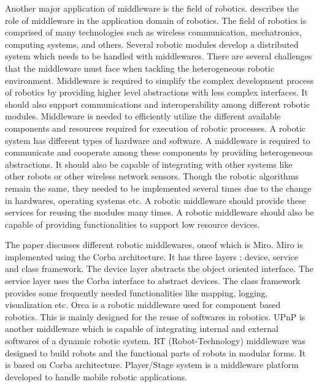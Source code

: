 \documentclass{acm_proc_article-sp}
\begin{document}

Another major application of middleware is the field of robotics. \cite{Mohamed:2011p8374} describes the role of middleware in the application domain of robotics. The field of robotics is comprised of many technologies such as wireless communication, mechatronics, computing systems, and others. Several robotic modules develop a distributed system which needs to be handled with middlewares. There are several challenges that the middleware must face when tackling the heterogeneous robotic environment. Middleware is required to simplify the complex development process of robotics by providing higher level abstractions with less complex interfaces. It should also support communications and interoperability among different robotic modules. Middleware is needed to efficiently utilize the different available components and resources required for execution of robotic processes. A robotic system has different types of hardware and software. A middleware is required to communicate and cooperate among these components by providing heterogeneous abstractions. It should also be capable of integrating with other systems like other robots or other wireless network sensors. Though the robotic algorithms remain the same, they needed to be implemented several times due to the change in hardwares, operating systems etc. A robotic middleware should provide these services for reusing the modules many times.  A robotic middleware should also be capable of providing functionalities to support low resource devices. 

The paper discusses different robotic middlewares, oneof which is Miro. Miro is implemented using the Corba architecture. It has three layers : device, service and class framework. The device layer abstracts the object oriented interface. The service layer uses the Corba interface to abstract devices. The class framework provides some frequently needed functionalities like mapping, logging, visualization etc. Orca is a robotic middleware used for component based robotics. This is mainly designed for the reuse of softwares in robotics.  UPnP is another middleware which is capable of integrating internal and external softwares of a dynamic robotic system.  RT (Robot-Technology) middleware was designed to build robots and the functional parts of robots in modular forms. It is based on Corba architecture. Player/Stage system is a middleware platform developed to handle mobile robotic applications.
\end{document}
